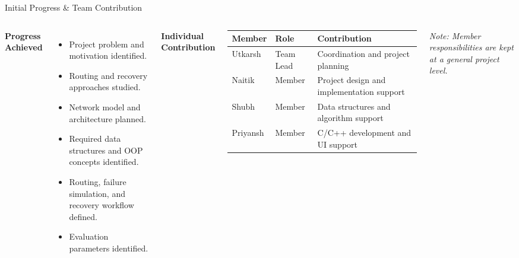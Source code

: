 \documentclass[aspectratio=169,11pt]{beamer}
\begin{document}
\begin{frame}{Initial Progress \& Team Contribution}

\begin{columns}[T,onlytextwidth]


\footnotesize
\textbf{\color{GEUBlue}Progress Achieved}

\begin{itemize}
\setlength{\itemsep}{1pt}

  \item Project problem and motivation identified.
  \item Routing and recovery approaches studied.
  \item Network model and architecture planned.
  \item Required data structures and OOP concepts identified.
  \item Routing, failure simulation, and recovery workflow defined.
  \item Evaluation parameters identified.

\end{itemize}



\footnotesize
\textbf{\color{GEUBlue}Individual Contribution}

\vspace{1mm}

\scriptsize

\begin{tabularx}{\linewidth}{@{}p{1.25cm}p{1.25cm}X@{}}
\toprule
Member & Role & Contribution\\
\midrule

Utkarsh & Team Lead & Coordination and project planning\\
Naitik & Member & Project design and implementation support\\
Shubh & Member & Data structures and algorithm support\\
Priyansh & Member & C/C++ development and UI support\\

\bottomrule
\end{tabularx}

\vspace{1mm}

\scriptsize
\textit{Note: Member responsibilities are kept at a general project level.}

\end{columns}

\end{frame}
\end{document}

